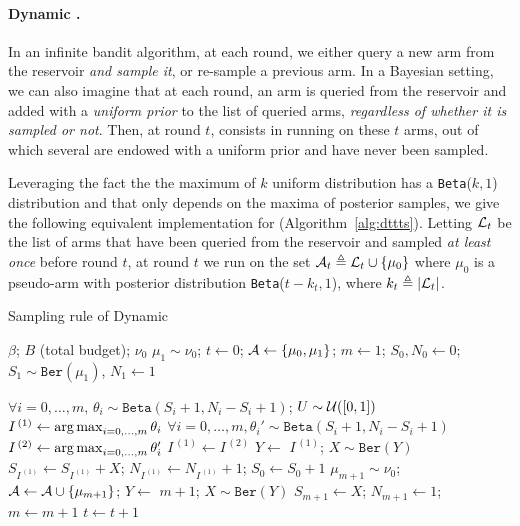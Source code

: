\paragraph{Dynamic \TTTS{}.}


In an infinite bandit algorithm, at each round, we either query a new arm from the reservoir \emph{and sample it}, or re-sample a previous arm. In a Bayesian setting, we can also imagine that at each round, an arm is queried from the reservoir and added with a \textit{uniform prior} to the list of queried arms, \emph{regardless of whether it is sampled or not}. Then, at round $t$, \DTTTS consists in running \TTTS on these $t$ arms, out of which several are endowed with a uniform prior and have never been sampled. 

Leveraging the fact the the maximum of $k$ uniform distribution has a \texttt{Beta}($k,1$) distribution and that \TTTS only depends on the maxima of posterior samples, we give the following equivalent implementation for \DTTTS (Algorithm~\ref{alg:dttts}). Letting $\mathcal{L}_t$ be the list of arms that have been queried  from the reservoir and sampled \textit{at least once} before round $t$, at round $t$ we run \TTTS on the set $\mathcal{A}_t \triangleq \mathcal{L}_t \cup \{\mu_0\}$ where $\mu_0$ is a pseudo-arm with posterior distribution \texttt{Beta}($t-k_t, 1$), where $k_t\triangleq|\mathcal{L}_t|$.  

\begin{algorithm}[ht]
\centering
\caption{Sampling rule of Dynamic \DTTTS{}}
\label{alg:dttts}
\begin{algorithmic}[1] %
     $\beta$; $B$ (total budget); $\nu_0$
     $\mu_1 \sim \nu_0$; $t \gets 0$; $\mathcal{A} \gets \{\mu_0,\mu_1\}$; $m\gets1$; $S_0, N_0 \gets 0$; $S_1 \sim \texttt{Ber}(\mu_1)$, $N_1 \gets 1$\
    
	    \State $\forall i=0,\dots,m$, $\theta_i \sim \texttt{Beta}(S_i+1,N_i-S_i+1)$; $U \sim \mathcal{U}([0,1])$
	    \State $I^{\,(1)} \gets \operatorname*{arg\,max}_{i=0,\dots,m} \theta_i$
	            \State $\forall i=0,\dots,m, \theta_i' \sim \texttt{Beta}(S_i+1,N_i-S_i+1)$
	            \State $I^{\,(2)} \leftarrow \operatorname*{arg\,max}_{i=0,\dots,m}\theta_i'$ 
	        \EndWhile
	        \State $I^{\,(1)} \gets I^{\,(2)}$
	    \EndIf
	        \State $Y \leftarrow$  $I^{\,(1)}$; $X \sim \texttt{Ber}(Y)$ 
	        \State $S_{I^{\,(1)}} \gets S_{I^{\,(1)}} + X$; $N_{I^{\,(1)}} \gets N_{I^{\,(1)}} + 1$; $S_0 \gets S_0 + 1$
	    \Else
            \State $\mu_{m+1}\sim \nu_0$; $\mathcal{A} \gets \mathcal{A} \cup \{\mu_{m+1}\}$; 
            \State $Y \leftarrow$  $m+1$; $X \sim \texttt{Ber}(Y)$
           	\State $S_{m+1} \gets X$; $N_{m+1}
           	\gets 1$; $m \gets m + 1$
 	   \EndIf
  	   \State $t\gets t+1$
    \EndWhile
\end{algorithmic}
\end{algorithm}

